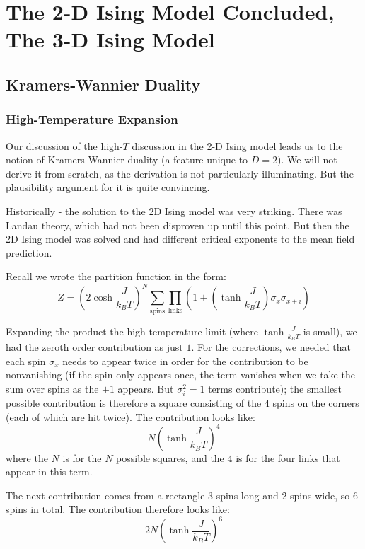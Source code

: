 \section{The 2-D Ising Model Concluded, The 3-D Ising Model}
\subsection{Kramers-Wannier Duality}
\subsubsection{High-Temperature Expansion}
Our discussion of the high-$T$ discussion in the 2-D Ising model leads us to the notion of Kramers-Wannier duality (a feature unique to $D = 2$). We will not derive it from scratch, as the derivation is not particularly illuminating. But the plausibility argument for it is quite convincing.

Historically - the solution to the 2D Ising model was very striking. There was Landau theory, which had not been disproven up until this point. But then the 2D Ising model was solved and had different critical exponents to the mean field prediction.

Recall we wrote the partition function in the form:
\begin{equation}
    Z = \left(2\cosh\frac{J}{k_B T}\right)^N\sum_{\text{spins}}\prod_{\text{links}}\left(1 + (\tanh\frac{J}{k_B T})\sigma_x\sigma_{x + i}\right)
\end{equation}

Expanding the product the high-temperature limit (where $\tanh\frac{J}{k_B T}$ is small), we had the zeroth order contribution as just $1$. For the corrections, we needed that each spin $\sigma_x$ needs to appear twice in order for the contribution to be nonvanishing (if the spin only appears once, the term vanishes when we take the sum over spins as the $\pm 1$ appears. But $\sigma_i^2 = 1$ terms contribute); the smallest possible contribution is therefore a square consisting of the 4 spins on the corners (each of which are hit twice). The contribution looks like:
\begin{equation}
    N\left(\tanh\frac{J}{k_B T}\right)^4
\end{equation}
where the $N$ is for the $N$ possible squares, and the $4$ is for the four links that appear in this term.

The next contribution comes from a rectangle 3 spins long and 2 spins wide, so 6 spins in total. The contribution therefore looks like:
\begin{equation}
    2N\left(\tanh\frac{J}{k_B T}\right)^6
\end{equation}

